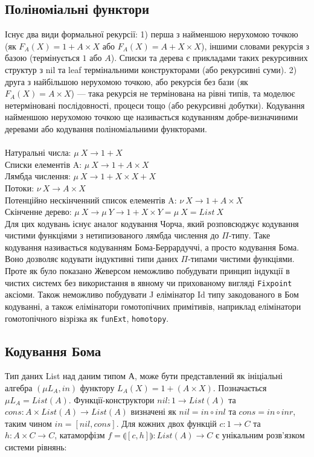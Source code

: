 \newpage
\subsection{Поліноміальні функтори}
Існує два види формальної рекурсії: 1) перша з найменшою нерухомою точкою
(як $F_A(X) = 1 + A \times X$ або $F_A(X) = A + X \times X$), іншими словами
рекурсія з базою (термінується $1$ або $A$). Списки та дерева є
прикладами таких рекурсивних структур з nil та leaf термінальними
конструкторами (або рекурсивні суми).
2) друга з найбільшою нерухомою точкою, або рекурсія без бази
(як $F_A(X) = A \times X$) --- така рекурсія не термінована на рівні типів,
та моделює нетерміновані послідовності, процеси тощо (або рекурсивні добутки).
Кодування найменшою нерухомою точкою ще називається кодуванням
добре-визначиними деревами або кодування поліноміальними функторами.
\\
\\
\noindent Натуральні числа: $\mu\ X \rightarrow 1 + X$\\
Списки елементів A: $\mu\ X \rightarrow 1 + A \times X$\\
Лямбда числення: $\mu\ X \rightarrow 1 + X \times X + X$\\
Потоки: $\nu\ X \rightarrow A \times X$\\
Потенційно нескінченний список елементів A: $\nu\ X \rightarrow 1 + A \times X$\\
Скінченне дерево: $\mu\ X \rightarrow \mu\ Y \rightarrow 1 + X \times Y = \mu\ X = List\ X$\\

Для цих кодувань існує аналог кодування Чорча, який розповсюджує
кодування чистими функціями з нетипизованого лямбда числення до $\Pi$-типу.
Таке кодування називається кодуванням Бома-Беррардуччі, а просто кодування Бома.
Воно дозволяє кодувати індуктивні типи даних $\Pi$-типами чистими функціями.
Проте як було показано Жеверсом\cite{Geuvers01} неможливо побудувати принцип
індукції в чистих системх без використання в явному чи прихованому
вигляді \lstinline{Fixpoint} аксіоми. Також неможливо побудувати
J елімінатор Id типу закодованого в Бом кодуванні, а також
елімінатори гомотопічних примітивів, наприклад елімінатори гомотопічного
візрізка як \lstinline{funExt}, \lstinline{homotopy}.

\newpage
\subsection{Кодування Бома}
Тип даних List над даним типом А, може бути представлений як ініціальні алгебра
$(\mu L_A, in)$ функтору $L_A(X) = 1 + (A \times X)$. Позначається $\mu L_A = List(A)$.
Функції-конструктори $nil: 1 \rightarrow List(A)$ та
$cons: A \times List(A) \rightarrow List(A)$ визначені як
$nil = in \circ inl$ та $cons = in \circ inr$, таким чином $in = [nil,cons]$.
Для кожних двох функцій $c: 1 \rightarrow C$ та $h: A \times C \rightarrow C$,
катаморфізм $f = \llparenthesis [c,h] \rrparenthesis : List(A) \rightarrow C$
є унікальним розв'язком системи рівнянь:

